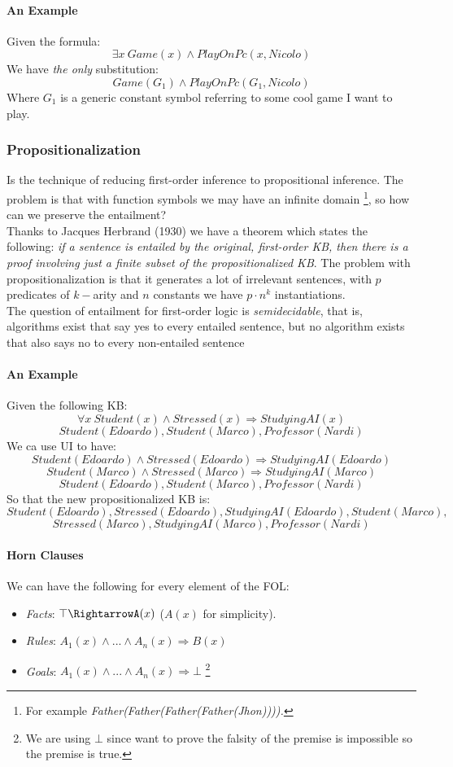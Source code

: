 \documentclass[10pt,a4paper]{article}
\begin{document}
\paragraph{An Example}
Given the formula:
\[\exists x\ Game(x)\wedge PlayOnPc(x,Nicolo)\]
We have \textit{the only} substitution:
\[Game(G_1)\wedge PlayOnPc(G_1,Nicolo)\]
Where $G_1$ is a generic constant symbol referring to some cool game I want to play.


\subsubsection{Propositionalization}
Is the technique of reducing first-order inference to propositional inference. The problem is that with function symbols we may have an infinite domain \footnote{For example \textit{Father(Father(Father(Father(Jhon)))).}}, so how can we preserve the entailment?\\
Thanks to Jacques Herbrand (1930) we have a theorem which states the following:
\textit{if a sentence is entailed by the original, first-order KB, then there is a proof involving just a finite subset of the propositionalized KB}. The problem with propositionalization is that it generates a lot of irrelevant sentences, with $p$  predicates of $k-$arity and $n$ constants we have $p\cdot n^k$ instantiations.\\
The question of entailment for first-order logic is \textit{semidecidable}, that is, algorithms exist that say yes to every entailed sentence, but no algorithm exists that also says no to every non-entailed sentence
 
\paragraph{An Example}
Given the following KB:
\[\forall x\  Student(x) \wedge Stressed(x) \Rightarrow StudyingAI(x)\]
\[Student(Edoardo),Student(Marco), Professor(Nardi)\]
We ca use UI to have:
\[Student(Edoardo) \wedge Stressed(Edoardo) \Rightarrow StudyingAI(Edoardo)\]
\[Student(Marco) \wedge Stressed(Marco) \Rightarrow StudyingAI(Marco)\]
\[Student(Edoardo),Student(Marco), Professor(Nardi)\]
So that the new propositionalized KB is:
\[Student(Edoardo), Stressed(Edoardo), StudyingAI(Edoardo),Student(Marco),\]
\[Stressed(Marco), StudyingAI(Marco), Professor(Nardi)\]

\paragraph{Horn Clauses}
We can have the following for every element of the FOL:
\begin{itemize}
\item \textit{Facts}: $\top\RightarrowA(x)$ ($A(x)$ for simplicity). 
\item \textit{Rules}: $A_1(x)\wedge...\wedge A_n(x)\Rightarrow B(x)$
\item \textit{Goals}: $A_1(x)\wedge...\wedge A_n(x)\Rightarrow \bot$ \footnote{We are using $\bot$ since want to prove the falsity of the premise is impossible so the premise is true.}
\end{itemize}
\end{document}
